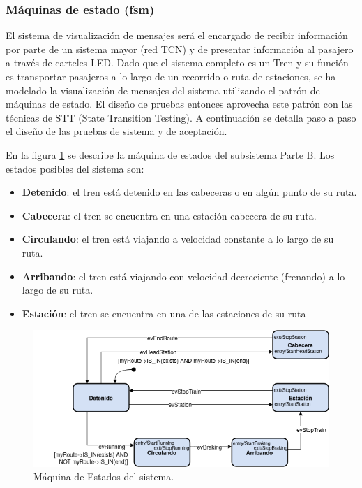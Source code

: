 \documentclass[
11pt, %
]{charter}
\begin{document}
\subsubsection{Máquinas de estado (fsm)}
El sistema de visualización de mensajes será el encargado de recibir información por parte de un sistema mayor (red TCN) y de presentar información al pasajero a través de carteles LED. Dado que el sistema completo es un Tren y su función es transportar pasajeros a lo largo de un recorrido o ruta de
estaciones, se ha modelado la visualización de mensajes del sistema  utilizando el patrón de máquinas de estado. El diseño de pruebas entonces aprovecha este patrón con las técnicas de STT
(State Transition Testing). A continuación se detalla paso a paso el diseño de las pruebas de sistema y de aceptación. 

En la figura \ref{fig:Statechart} se describe la máquina de estados del subsistema Parte B. Los estados posibles
del sistema son:
\begin{itemize}
\item \textbf{Detenido}: el tren está detenido en las cabeceras o en algún punto de su ruta.
\item \textbf{Cabecera}: el tren se encuentra en una estación cabecera de su ruta.
\item \textbf{Circulando}: el tren está viajando a velocidad constante a lo largo de su ruta.
\item \textbf{Arribando}: el tren está viajando con velocidad decreciente (frenando) a lo largo de su
ruta.
\item \textbf{Estación}: el tren se encuentra en una de las estaciones de su ruta
\end{itemize}

\begin{figure}[htpb]
\centering 
\includegraphics[width=1\textwidth]{./Pics/Statechart.png}
\caption{Máquina de Estados del sistema.}
\label{fig:Statechart}
\end{figure}
\end{document}

